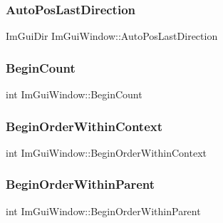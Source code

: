 \hypertarget{struct_im_gui_window_aa8219e984ed273d6cfd19fb4b93eff5e}{}\label{struct_im_gui_window_aa8219e984ed273d6cfd19fb4b93eff5e} 
\subsubsection{\texorpdfstring{Auto\+Pos\+Last\+Direction}{AutoPosLastDirection}}
{\footnotesize\ttfamily Im\+Gui\+Dir Im\+Gui\+Window\+::\+Auto\+Pos\+Last\+Direction}

\hypertarget{struct_im_gui_window_aa27229a425dc17303be1cd8f4a61c17f}{}\label{struct_im_gui_window_aa27229a425dc17303be1cd8f4a61c17f} 
\subsubsection{\texorpdfstring{Begin\+Count}{BeginCount}}
{\footnotesize\ttfamily int Im\+Gui\+Window\+::\+Begin\+Count}

\hypertarget{struct_im_gui_window_ae0cb2f2346c1a9264210626a99997506}{}\label{struct_im_gui_window_ae0cb2f2346c1a9264210626a99997506} 
\subsubsection{\texorpdfstring{Begin\+Order\+Within\+Context}{BeginOrderWithinContext}}
{\footnotesize\ttfamily int Im\+Gui\+Window\+::\+Begin\+Order\+Within\+Context}

\hypertarget{struct_im_gui_window_a9299370fd06dff8c36988743db5b90fd}{}\label{struct_im_gui_window_a9299370fd06dff8c36988743db5b90fd} 
\subsubsection{\texorpdfstring{Begin\+Order\+Within\+Parent}{BeginOrderWithinParent}}
{\footnotesize\ttfamily int Im\+Gui\+Window\+::\+Begin\+Order\+Within\+Parent}

